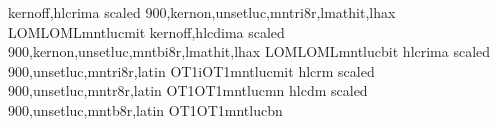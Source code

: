 



\installfonts
{}
      {kernoff,hlcrima scaled 900,kernon,unsetluc,mntri8r,lmathit,lhax}
      {LOML}{OML}{mntluc}{m}{it}{}
      {kernoff,hlcdima scaled 900,kernon,unsetluc,mntbi8r,lmathit,lhax}
      {LOML}{OML}{mntluc}{b}{it}{}
%
      {hlcrima scaled 900,unsetluc,mntri8r,latin}
      {OT1i}{OT1}{mntluc}{m}{it}{}
      {hlcrm scaled 900,unsetluc,mntr8r,latin}
      {OT1}{OT1}{mntluc}{m}{n}{}
      {hlcdm scaled 900,unsetluc,mntb8r,latin}
      {OT1}{OT1}{mntluc}{b}{n}{}
 \endinstallfonts

\bye
